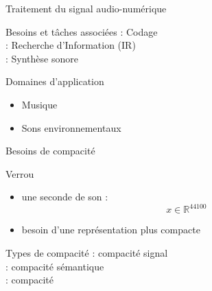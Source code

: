 \begin{frame}{Traitement du signal audio-numérique}
\begin{block}{Besoins et tâches associées}
: Codage \\
: Recherche d'Information (IR) \\
: Synthèse sonore
\end{block}
\begin{block}{Domaines d'application}
\begin{itemize}
\item Musique
\item Sons environnementaux
\end{itemize}
\end{block}
\end{frame}


\begin{frame}{Besoins de compacité}
\begin{block}{Verrou}
\begin{itemize}
\item une seconde de son : $$ x \in \mathbb{R}^{44100}$$
\item besoin d'une représentation plus compacte
\end{itemize}
\end{block}
\begin{block}{Types de compacité}
: compacité signal \\ %
: compacité sémantique \\ %
: compacité \alert{\og}  \alert{\fg} \\ %
\end{block}
\end{frame}
